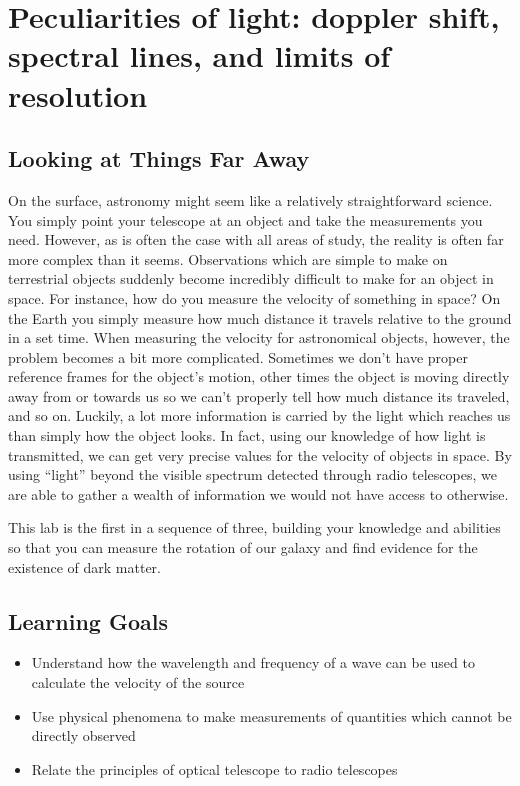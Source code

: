 \chapter{Peculiarities of light: doppler shift, spectral lines, and limits of resolution}



\section{Looking at Things Far Away}
On the surface, astronomy might seem like a relatively straightforward science. You simply point your telescope at an object and take the measurements you need. However, as is often the case with all areas of study, the reality is often far more complex than it seems. Observations which are simple to make on terrestrial objects suddenly become incredibly difficult to make for an object in space. For instance, how do you measure the velocity of something in space? On the Earth you simply measure how much distance it travels relative to the ground in a set time. When measuring the velocity for astronomical objects, however, the problem becomes a bit more complicated. Sometimes we don't have proper reference frames for the object's motion, other times the object is moving directly away from or towards us so we can't properly tell how much distance its traveled, and so on. Luckily, a lot more information is carried by the light which reaches us than simply how the object looks. In fact, using our knowledge of how light is transmitted, we can get very precise values for the velocity of objects in space. By using ``light'' beyond the visible spectrum detected through radio telescopes, we are able to gather a wealth of information we would not have access to otherwise.

This lab is the first in a sequence of three, building your knowledge and abilities so that you can measure the rotation of our galaxy and find evidence for the existence of dark matter.


\section{Learning Goals}
\begin{itemize}
	\item Understand how the wavelength and frequency of a wave can be used to calculate the velocity of the source
	
	\item Use physical phenomena to make measurements of quantities which cannot be directly observed
	
	\item Relate the principles of optical telescope to radio telescopes
\end{itemize}

